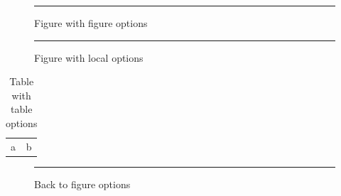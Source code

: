 \documentclass{article}
\begin{document}
\begin{figure}[h]
\centering\rule{3cm}{1cm}
\caption{Figure with figure options}
\end{figure}
\begin{figure}[h]
\captionsetup{labelfont=bf,justification=raggedleft,singlelinecheck=false}
\centering\rule{3cm}{1cm}
\caption{Figure with local options}
\end{figure}
\begin{table}[h]
\caption{Table with table options}
\centering\begin{tabular}{ll}a&b\\\end{tabular}
\end{table}
\begin{figure}[h]
\centering\rule{3cm}{1cm}
\caption{Back to figure options}
\end{figure}
\end{document}
